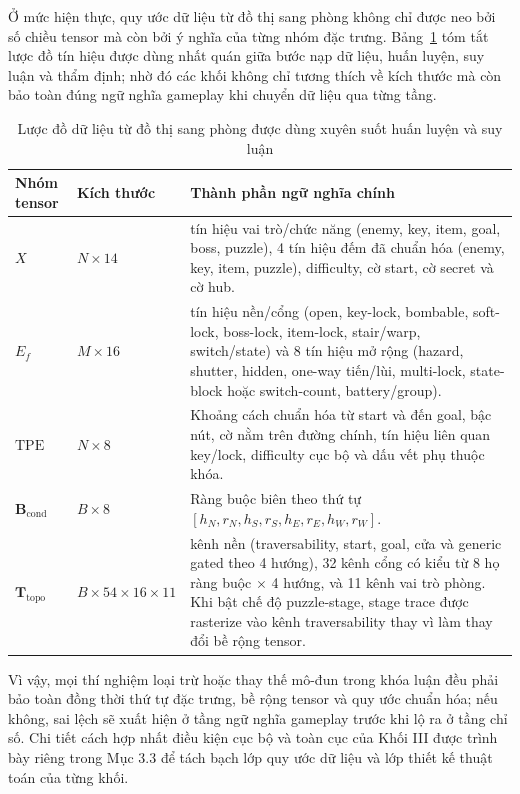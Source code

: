 \documentclass[oneside,a4paper,12pt]{extreport}
\begin{document}
Ở mức hiện thực, quy ước dữ liệu từ đồ thị sang phòng không chỉ được neo bởi số chiều tensor mà còn bởi ý nghĩa của từng nhóm đặc trưng. Bảng~\ref{tab:graph_room_contract} tóm tắt lược đồ tín hiệu được dùng nhất quán giữa bước nạp dữ liệu, huấn luyện, suy luận và thẩm định; nhờ đó các khối không chỉ tương thích về kích thước mà còn bảo toàn đúng ngữ nghĩa gameplay khi chuyển dữ liệu qua từng tầng.

\begin{table}[H]
\centering
\caption{Lược đồ dữ liệu từ đồ thị sang phòng được dùng xuyên suốt huấn luyện và suy luận}
\label{tab:graph_room_contract}
\footnotesize
\begin{tabular}{>{\raggedright\arraybackslash}p{2.1cm} >{\raggedright\arraybackslash}p{2.7cm} >{\raggedright\arraybackslash}p{8.1cm}}
\toprule
Nhóm tensor & Kích thước & Thành phần ngữ nghĩa chính \\
\midrule
$X$ & $N\times 14$ & 6 tín hiệu vai trò/chức năng (enemy, key, item, goal, boss, puzzle), 4 tín hiệu đếm đã chuẩn hóa (enemy, key, item, puzzle), difficulty, cờ start, cờ secret và cờ hub. \\
$E_f$ & $M\times 16$ & 8 tín hiệu nền/cổng (open, key-lock, bombable, soft-lock, boss-lock, item-lock, stair/warp, switch/state) và 8 tín hiệu mở rộng (hazard, shutter, hidden, one-way tiến/lùi, multi-lock, state-block hoặc switch-count, battery/group). \\
$\mathrm{TPE}$ & $N\times 8$ & Khoảng cách chuẩn hóa từ start và đến goal, bậc nút, cờ nằm trên đường chính, tín hiệu liên quan key/lock, difficulty cục bộ và dấu vết phụ thuộc khóa. \\
$\mathbf{B}_{\text{cond}}$ & $B\times 8$ & Ràng buộc biên theo thứ tự $[h_N,r_N,h_S,r_S,h_E,r_E,h_W,r_W]$. \\
$\mathbf{T}_{\text{topo}}$ & $B\times 54\times 16\times 11$ & 11 kênh nền (traversability, start, goal, cửa và generic gated theo 4 hướng), 32 kênh cổng có kiểu từ 8 họ ràng buộc $\times$ 4 hướng, và 11 kênh vai trò phòng. Khi bật chế độ puzzle-stage, stage trace được rasterize vào kênh traversability thay vì làm thay đổi bề rộng tensor. \\
\bottomrule
\end{tabular}
\end{table}

Vì vậy, mọi thí nghiệm loại trừ hoặc thay thế mô-đun trong khóa luận đều phải bảo toàn đồng thời thứ tự đặc trưng, bề rộng tensor và quy ước chuẩn hóa; nếu không, sai lệch sẽ xuất hiện ở tầng ngữ nghĩa gameplay trước khi lộ ra ở tầng chỉ số.
Chi tiết cách hợp nhất điều kiện cục bộ và toàn cục của Khối III được trình bày riêng trong Mục 3.3 để tách bạch lớp quy ước dữ liệu và lớp thiết kế thuật toán của từng khối.
\end{document}
